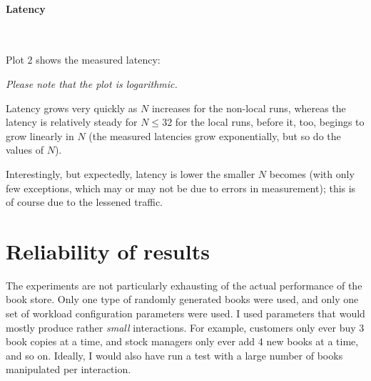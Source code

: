 \paragraph{Latency}~\smallskip

Plot 2 shows the measured latency:


\textit{Please note that the plot is logarithmic.}\medskip

Latency grows very quickly as $N$ increases for the non-local runs, whereas the
latency is relatively steady for $N \leq 32$ for the local runs, before it, too,
begings to grow linearly in $N$ (the measured latencies grow exponentially, but
so do the values of $N$). \medskip

Interestingly, but expectedly, latency is lower the smaller $N$ becomes (with
only few exceptions, which may or may not be due to errors in measurement); this
is of course due to the lessened traffic.

\streg

\newpage

\section{Reliability of results}

The experiments are not particularly exhausting of the actual performance of the
book store. Only one type of randomly generated books were used, and only one
set of workload configuration parameters were used. I used parameters that would
mostly produce rather \textit{small} interactions. For example, customers only
ever buy 3 book copies at a time, and stock managers only ever add 4 new books
at a time, and so on. Ideally, I would also have run a test with a large number
of books manipulated per interaction.

\tykstreg
